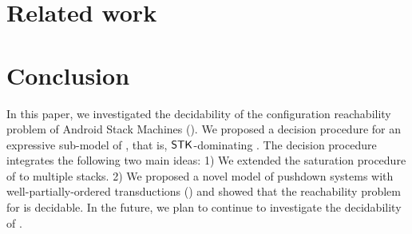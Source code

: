 \documentclass[preprint,12pt]{elsarticle}
\begin{document}
\section{Related work}
%



\section{Conclusion}
% 
In this paper, we investigated the decidability of the configuration reachability problem of Android Stack Machines (\AMASS). We proposed a decision procedure for an expressive sub-model of {\AMASS}, that is, $\mathsf{STK}$-dominating {\AMASS}. The decision procedure integrates the following two main ideas: 1) We extended the saturation procedure of {\PDS} to multiple stacks. 2) We proposed a novel model of pushdown systems with well-partially-ordered transductions (\WOTrPDS) and showed that the reachability problem for {\WOTrPDS} is decidable.
In the future, we plan to continue to investigate the decidability of {\AMASS}. 

\newpage
%
  




%

%
%
%
%
%
%
\newpage
\appendix
% 
\end{document}
